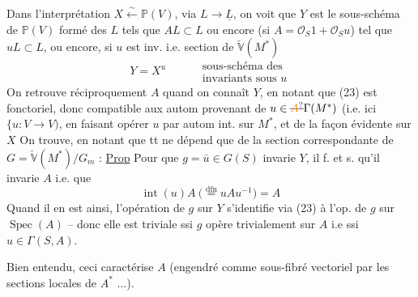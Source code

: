 Dans l'interprétation $X\xleftarrow{\sim}\mathbb P(V)$, via $L\rightarrow\underline L$, on voit que $Y$ est le sous-schéma de $\mathbb P(V)$ formé des $L$ tels que $AL\subset L$ ou encore (si $A=\mathcal O_S1+\mathcal O_Su$) tel que $uL\subset L$, ou encore, si $u$ est inv. i.e. section de $\check{\mathbb V}(M^*)$
\[
 Y=X^u\qquad\begin{aligned}
 &\text{sous-schéma des}\\[-2pt]
 &\text{invariants sous }u
 \end{aligned}\tag*{(24)}
\]
On retrouve réciproquement $A$ quand on connaît $Y$, en notant que  (23) est fonctoriel, donc compatible aux autom provenant de $u\in\deleted{\unsure{A}}\Gamma(M^*)$ (i.e. ici $\{u:V\to V)$, en faisant opérer $u$ par autom int. sur $M^*$, et de la façon évidente sur $X$ \unsure{$\leftarrow$|\ldots}
On trouve, en notant que tt ne dépend que de la section correspondante de $G=\check{\mathbb V}(M^*)/G_m$ :
\uline{Prop} Pour que $g=\bar u\in G(S)$ invarie $Y$, il f. et s. qu'il invarie $A$ i.e. que 
\[
 \operatorname{int}(u)A\ \bigl(\overset{\mathrm{dfn}}{=}uAu^{-1}\bigr)=A
\]
Quand il en est ainsi, l'opération de $g$ sur $Y$  s'identifie via (23) à l'op. de $g$  sur $\operatorname{Spec}(A)$ -- donc elle est triviale ssi $g$ opère trivialement sur $A$ i.e ssi $u\in\Gamma(S,A)$.

Bien entendu, ceci caractérise $A$  (engendré comme sous-fibré vectoriel par les sections locales de $A^*$ ...).

